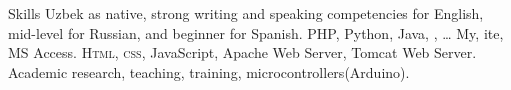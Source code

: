 
\begin{rubric}{\faStar  Skills}
\entry*[Languages]
	Uzbek as native, strong writing and speaking competencies for English, mid-level for Russian, and beginner for Spanish.
	PHP, Python, Java, , \ldots
\entry*[Databases]
	My, ite, MS Access.
	\textsc{Html, css}, JavaScript, Apache Web Server, Tomcat Web Server.
\entry*[Misc.]
	Academic research, teaching, training, microcontrollers(Arduino).
\end{rubric}
